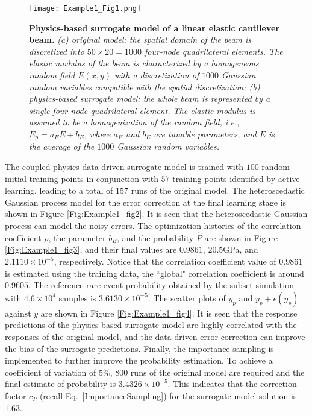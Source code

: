 \documentclass[number,preprint,3p]{elsarticle}
\newcommand{\1}[2]{\mathbb{I}_{#1}\left(#2\right)}
\begin{document}
\begin{figure}[H]
		\centering
		\texttt{[image: Example1\_Fig1.png]}
		\caption{\textbf{Physics-based surrogate model of a linear elastic cantilever beam.} \textit{(a) original model: the spatial domain of the beam is discretized into $50\times 20=1000$ four-node quadrilateral elements. The elastic modulus of the beam is characterized by a homogeneous random field $E(x,y)$ with a discretization of $1000$ Gaussian random variables compatible with the spatial discretization; (b) physics-based surrogate model: the whole beam is represented by a single four-node quadrilateral element. The elastic modulus is assumed to be a homogenization of the random field, i.e., $E_{p}=a_{E}\bar{E}+b_{E}$, where $a_{E}$ and $b_{E}$ are tunable parameters, and $\bar{E}$ is the average of the $1000$ Gaussian random variables.}}
		\label{Fig:Example1_fig1}
	\end{figure}
	
The coupled physics-data-driven surrogate model is trained with $100$ random initial training points in conjunction with $57$ training points identified by active learning, leading to a total of $157$ runs of the original model. The heteroscedastic Gaussian process model for the error correction at the final learning stage is shown in Figure \ref{Fig:Example1_fig2}. It is seen that the heteroscedastic Gaussian process can model the noisy errors. The optimization histories of the correlation coefficient ${\rho}$, the parameter $b_{E}$, and the probability $\hat{P}$ are shown in Figure \ref{Fig:Example1_fig3}, and their final values are $0.9861$, $20.5$GPa, and $2.1110\times10^{-5}$, respectively. Notice that the correlation coefficient value of $0.9861$ is estimated using the training data, the ``global" correlation coefficient is around $0.9605$. The reference rare event probability obtained by the subset simulation with $4.6\times 10^{4}$ samples is $3.6130\times10^{-5}$. The scatter plots of $y_p$ and $y_p+\epsilon(y_p)$ against $y$ are shown in Figure \ref{Fig:Example1_fig4}. It is seen that the response predictions of the physics-based surrogate model are highly correlated with the responses of the original model, and the data-driven error correction can improve the bias of the surrogate predictions. Finally, the importance sampling is implemented to further improve the probability estimation. To achieve a coefficient of variation of $5\%$, 800 runs of the original model are required and the final estimate of probability is $3.4326\times10^{-5}$. This indicates that the correction factor $c_P$ (recall Eq.~\eqref{ImportanceSampling}) for the surrogate model solution is $1.63$.
	
\end{document}
